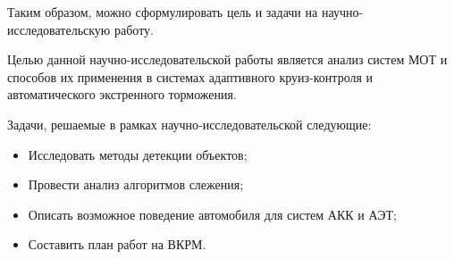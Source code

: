 Таким образом, можно сформулировать цель и задачи на научно-исследовательскую работу. 

Целью данной научно-исследовательской работы является анализ систем МОТ и способов их применения в системах адаптивного круиз-контроля и автоматического экстренного торможения.

Задачи, решаемые в рамках научно-исследовательской следующие:

\begin{itemize}

	\item Исследовать методы детекции объектов;
	
 	\item Провести анализ алгоритмов слежения;
	
	\item Описать возможное поведение автомобиля для систем АКК и АЭТ;
	
	\item Составить план работ на ВКРМ.
	
\end{itemize}

